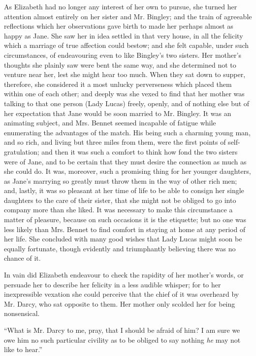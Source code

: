 As Elizabeth had no longer any interest of her own to pursue, she turned her attention almost entirely on her sister and Mr. Bingley; and the train of agreeable reflections which her observations gave birth to made her perhaps almost as happy as Jane. She saw her in idea settled in that very house, in all the felicity which a marriage of true affection could bestow; and she felt capable, under such circumstances, of endeavouring even to like Bingley's two sisters. Her mother's thoughts she plainly saw were bent the same way, and she determined not to venture near her, lest she might hear too much. When they sat down to supper, therefore, she considered it a most unlucky perverseness which placed them within one of each other; and deeply was she vexed to find that her mother was talking to that one person (Lady Lucas) freely, openly, and of nothing else but of her expectation that Jane would be soon married to Mr. Bingley. It was an animating subject, and Mrs. Bennet seemed incapable of fatigue while enumerating the advantages of the match. His being such a charming young man, and so rich, and living but three miles from them, were the first points of self-gratulation; and then it was such a comfort to think how fond the two sisters were of Jane, and to be certain that they must desire the connection as much as she could do. It was, moreover, such a promising thing for her younger daughters, as Jane's marrying so greatly must throw them in the way of other rich men; and, lastly, it was so pleasant at her time of life to be able to consign her single daughters to the care of their sister, that she might not be obliged to go into company more than she liked. It was necessary to make this circumstance a matter of pleasure, because on such occasions it is the etiquette; but no one was less likely than Mrs. Bennet to find comfort in staying at home at any period of her life. She concluded with many good wishes that Lady Lucas might soon be equally fortunate, though evidently and triumphantly believing there was no chance of it.

In vain did Elizabeth endeavour to check the rapidity of her mother's words, or persuade her to describe her felicity in a less audible whisper; for to her inexpressible vexation she could perceive that the chief of it was overheard by Mr. Darcy, who sat opposite to them. Her mother only scolded her for being nonsensical.

``What is Mr. Darcy to me, pray, that I should be afraid of him? I am sure we owe him no such particular civility as to be obliged to say nothing \textit{he} may not like to hear.''

